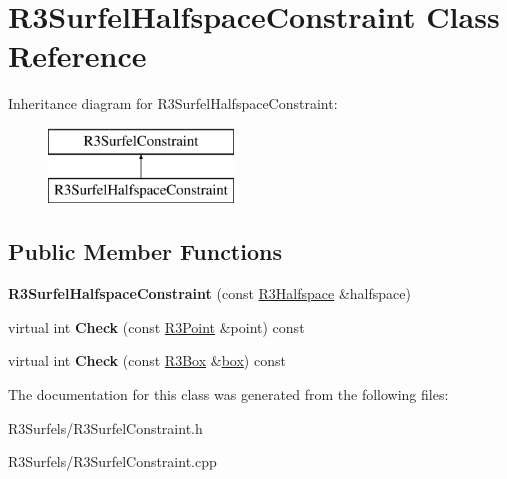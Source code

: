 \hypertarget{class_r3_surfel_halfspace_constraint}{}\section{R3\+Surfel\+Halfspace\+Constraint Class Reference}
\label{class_r3_surfel_halfspace_constraint}
Inheritance diagram for R3\+Surfel\+Halfspace\+Constraint\+:\begin{figure}[H]
\begin{center}
\leavevmode
\includegraphics[height=2.000000cm]{class_r3_surfel_halfspace_constraint}
\end{center}
\end{figure}
\subsection*{Public Member Functions}
\begin{DoxyCompactItemize}
\item 
{\bfseries R3\+Surfel\+Halfspace\+Constraint} (const \hyperlink{class_r3_halfspace}{R3\+Halfspace} \&halfspace)\hypertarget{class_r3_surfel_halfspace_constraint_af550a5a58a2d38b2c42151eef4a11fce}{}\label{class_r3_surfel_halfspace_constraint_af550a5a58a2d38b2c42151eef4a11fce}

\item 
virtual int {\bfseries Check} (const \hyperlink{class_r3_point}{R3\+Point} \&point) const \hypertarget{class_r3_surfel_halfspace_constraint_a78ecbe1a999a62f30db878c6b186729c}{}\label{class_r3_surfel_halfspace_constraint_a78ecbe1a999a62f30db878c6b186729c}

\item 
virtual int {\bfseries Check} (const \hyperlink{class_r3_box}{R3\+Box} \&\hyperlink{structbox}{box}) const \hypertarget{class_r3_surfel_halfspace_constraint_ab22073db76565165649c2ea5ce1dae00}{}\label{class_r3_surfel_halfspace_constraint_ab22073db76565165649c2ea5ce1dae00}

\end{DoxyCompactItemize}


The documentation for this class was generated from the following files\+:\begin{DoxyCompactItemize}
\item 
R3\+Surfels/R3\+Surfel\+Constraint.\+h\item 
R3\+Surfels/R3\+Surfel\+Constraint.\+cpp\end{DoxyCompactItemize}

